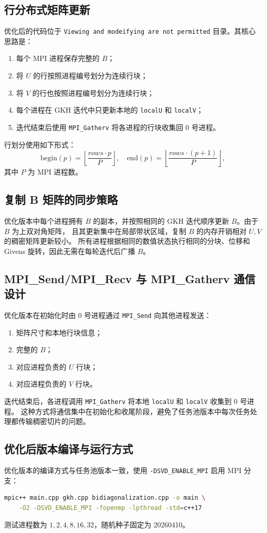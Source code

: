 \documentclass[UTF8,a4paper,10pt]{ctexart}
\begin{document}
\subsection{行分布式矩阵更新}
优化后的代码位于 \verb|Viewing and modeifying are not permitted| 目录。其核心思路是：
\begin{enumerate}
  \item 每个 MPI 进程保存完整的 $B$；
  \item 将 $U$ 的行按照进程编号划分为连续行块；
  \item 将 $V$ 的行也按照进程编号划分为连续行块；
  \item 每个进程在 GKH 迭代中只更新本地的 \verb|localU| 和 \verb|localV|；
  \item 迭代结束后使用 \verb|MPI_Gatherv| 将各进程的行块收集回 0 号进程。
\end{enumerate}

行划分使用如下形式：
\[
  \text{begin}(p)=\left\lfloor\frac{rows\cdot p}{P}\right\rfloor,\quad
  \text{end}(p)=\left\lfloor\frac{rows\cdot (p+1)}{P}\right\rfloor,
\]
其中 $P$ 为 MPI 进程数。

\subsection{复制 B 矩阵的同步策略}
优化版本中每个进程拥有 $B$ 的副本，并按照相同的 GKH 迭代顺序更新 $B$。由于 $B$ 为上双对角矩阵，
且其更新集中在局部带状区域，复制 $B$ 的内存开销相对 $U,V$ 的稠密矩阵更新较小。
所有进程根据相同的数值状态执行相同的分块、位移和 Givens 旋转，因此无需在每轮迭代后广播 $B$。

\subsection{MPI\_Send/MPI\_Recv 与 MPI\_Gatherv 通信设计}
优化版本在初始化时由 0 号进程通过 \verb|MPI_Send| 向其他进程发送：
\begin{enumerate}
  \item 矩阵尺寸和本地行块信息；
  \item 完整的 $B$；
  \item 对应进程负责的 $U$ 行块；
  \item 对应进程负责的 $V$ 行块。
\end{enumerate}
迭代结束后，各进程调用 \verb|MPI_Gatherv| 将本地 \verb|localU| 和 \verb|localV| 收集到 0 号进程。
这种方式将通信集中在初始化和收尾阶段，避免了任务池版本中每次任务处理都传输稠密切片的问题。

\subsection{优化后版本编译与运行方式}
优化版本的编译方式与任务池版本一致，使用 \verb|-DSVD_ENABLE_MPI| 启用 MPI 分支：
\begin{lstlisting}[language=bash]
mpic++ main.cpp gkh.cpp bidiagonalization.cpp -o main \
    -O2 -DSVD_ENABLE_MPI -fopenmp -lpthread -std=c++17
\end{lstlisting}
测试进程数为 $1,2,4,8,16,32$，随机种子固定为 20260410。
\end{document}
